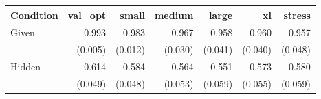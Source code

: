 \begin{tabular}{lrrrrrr}
\toprule
Condition & val\_opt & small & medium & large & xl & stress \\
\midrule
Given & 0.993 & 0.983 & 0.967 & 0.958 & 0.960 & 0.957 \\
 & (0.005) & (0.012) & (0.030) & (0.041) & (0.040) & (0.048) \\
Hidden & 0.614 & 0.584 & 0.564 & 0.551 & 0.573 & 0.580 \\
 & (0.049) & (0.048) & (0.053) & (0.059) & (0.055) & (0.059) \\
\bottomrule
\end{tabular}
